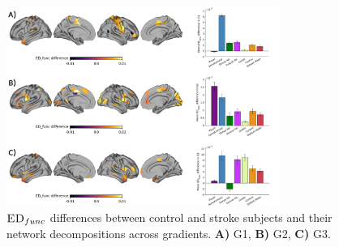 \documentclass[fleqn,10pt]{wlscirep}
\begin{document}
\begin{figure}[h!]
\centering
\includegraphics[width=0.8\textwidth]{figures/1dfunc.png}
\renewcommand{\figurename}{Supplementary Figure}
\caption{\label{fig:1Dedfunc} $\textsc{ED}_{func}$ differences between control and stroke subjects and their network decompositions across gradients. \textbf{A) } G1, \textbf{B) } G2, \textbf{C) } G3.}
\end{figure}



\centering
\end{document}
